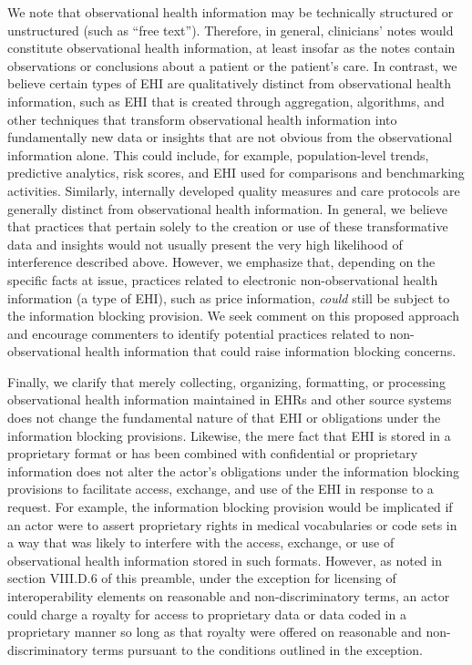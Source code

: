 \documentclass[twoside,11pt]{article}
\begin{document}
          We note that observational health information may be technically structured or unstructured (such as “free text”). Therefore, in general, clinicians' notes would constitute observational health information, at least insofar as the notes contain observations or conclusions about a patient or the patient's care. In contrast, we believe certain types of EHI are qualitatively distinct from observational health information, such as EHI that is created through aggregation, algorithms, and other techniques that transform observational health information into fundamentally new data or insights that are not obvious from the observational  \ifhmode\expandafter\xspace\fi information alone. This could include, for example, population-level trends, predictive analytics, risk scores, and EHI used for comparisons and benchmarking activities. Similarly, internally developed quality measures and care protocols are generally distinct from observational health information. In general, we believe that practices that pertain solely to the creation or use of these transformative data and insights would not usually present the very high likelihood of interference described above. However, we emphasize that, depending on the specific facts at issue, practices related to electronic non-observational health information (a type of EHI), such as price information, \emph{could} still be subject to the information blocking provision. We seek comment on this proposed approach and encourage commenters to identify potential practices related to non-observational health information that could raise information blocking concerns.


          Finally, we clarify that merely collecting, organizing, formatting, or processing observational health information maintained in EHRs and other source systems does not change the fundamental nature of that EHI or obligations under the information blocking provisions. Likewise, the mere fact that EHI is stored in a proprietary format or has been combined with confidential or proprietary information does not alter the actor's obligations under the information blocking provisions to facilitate access, exchange, and use of the EHI in response to a request. For example, the information blocking provision would be implicated if an actor were to assert proprietary rights in medical vocabularies or code sets in a way that was likely to interfere with the access, exchange, or use of observational health information stored in such formats. However, as noted in section VIII.D.6 of this preamble, under the exception for licensing of interoperability elements on reasonable and non-discriminatory terms, an actor could charge a royalty for access to proprietary data or data coded in a proprietary manner so long as that royalty were offered on reasonable and non-discriminatory terms pursuant to the conditions outlined in the exception.
\end{document}
